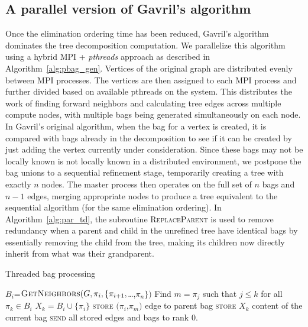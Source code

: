 \documentclass[conference]{IEEEtran}
\begin{document}
\subsection{A parallel version of Gavril's algorithm}
Once the elimination ordering time has been reduced, Gavril's algorithm ~\cite{Gavril1974} %
dominates the tree decomposition computation. We parallelize this algorithm
using a hybrid MPI + \emph{pthreads} approach as described in Algorithm~\ref{alg:pbag_gen}.
Vertices of the original graph are distributed evenly between MPI processes. 
The vertices are then assigned to each MPI process and further divided based on 
available pthreads on the system.
This distributes the work of finding forward neighbors and calculating tree edges across multiple compute nodes, with multiple bags being generated simultaneously on each node.
In Gavril's original algorithm, when the bag for a vertex is created, it is compared with bags already in the decomposition to see
if it can be created by just adding the vertex currently under consideration. Since these bags may not be locally known
is not locally known in a distributed environment, we postpone the bag unions to
a sequential refinement stage, temporarily creating a tree with exactly $n$ nodes. The master process then operates on the full set of
$n$ bags and $n-1$ edges, merging appropriate nodes to produce a tree equivalent to the sequential
algorithm (for the same elimination ordering). In Algorithm~\ref{alg:par_td},
the subroutine \textsc{ReplaceParent} is used to remove redundancy when a parent and child in the unrefined tree have identical bags by essentially removing the child from the tree, making its children now directly inherit from what was their grandparent.

\begin{algorithm}[ht!]
\caption{Threaded bag processing}
\label{alg:pbag_gen}
\begin{algorithmic}[1]
\State $B_i$=$\text{\textsc{GetNeighbors}}(G,\pi_i,\{\pi_{i+1},${\tiny \ldots},$\pi_n\})$
\State Find $m = \pi_{j}$ such that $j \leq k$ for all $\pi_{k} \in
B_{i}$
\State $X_{k} = B_{i} \cup \{\pi_{i}\}$
\State \textsc{store} $(\pi_{i}$,$\pi_{m})$
\Comment edge to parent bag
\State \textsc{store} $X_{k}$
\Comment content of the current bag
\EndFor
\State \textsc{send} all stored edges and bags to rank 0.
\EndProcedure
\end{algorithmic}
\end{algorithm}
\end{document}

